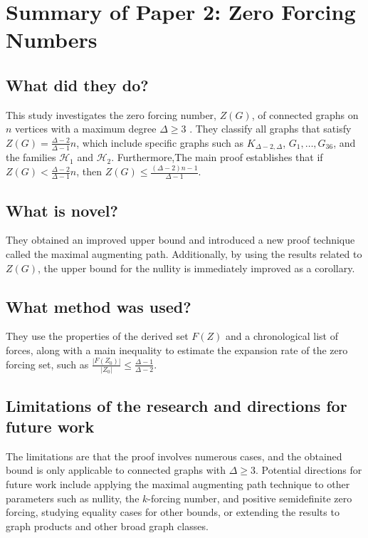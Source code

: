 \documentclass[12pt, a4paper]{article}
\newcommand{\zg}{Z(G)}
\newcommand{\maxdeg}{\Delta} %
\begin{document}
\section{Summary of Paper 2: Zero Forcing Numbers}

\subsection{What did they do?}
This study investigates the zero forcing number, $\zg$, of connected graphs on $n$ vertices with a maximum degree $\maxdeg \ge 3$ \cite{paper2}. They classify all graphs that satisfy $\zg = \frac{\maxdeg - 2}{\maxdeg - 1}n$, which include specific graphs such as $K_{\maxdeg-2, \maxdeg}$, $G_1, \dots, G_{36}$, and the families $\mathcal{H}_1$ and $\mathcal{H}_2$. Furthermore,The main proof establishes that if $\zg < \frac{\maxdeg - 2}{\maxdeg - 1}n$, then $\zg \le \frac{(\maxdeg - 2)n - 1}{\maxdeg - 1}$.

\subsection{What is novel?}
They obtained an improved upper bound and introduced a new proof technique called the maximal augmenting path. Additionally, by using the results related to $\zg$, the upper bound for the nullity is immediately improved as a corollary.

\subsection{What method was used?}
They use the properties of the derived set $F(Z)$ and a chronological list of forces, along with a main inequality to estimate the expansion rate of the zero forcing set, such as $\frac{|F(Z_0)|}{|Z_0|} \leq \frac{\maxdeg - 1}{\maxdeg - 2}$.

\subsection{Limitations of the research and directions for future work}
The limitations are that the proof involves numerous cases, and the obtained bound is only applicable to connected graphs with $\maxdeg \geq 3$. Potential directions for future work include applying the maximal augmenting path technique to other parameters such as nullity, the $k$-forcing number, and positive semidefinite zero forcing, studying equality cases for other bounds, or extending the results to graph products and other broad graph classes.
\end{document}
